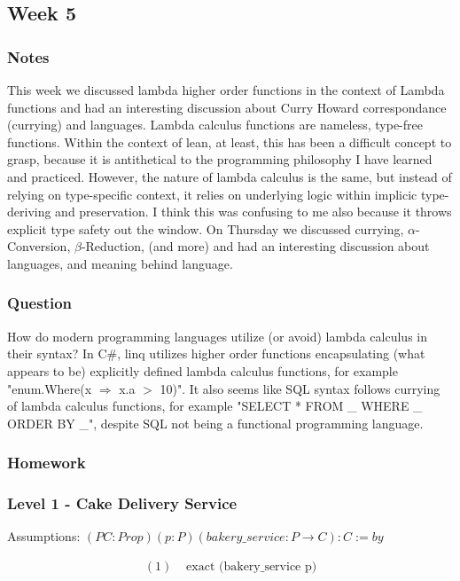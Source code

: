 \documentclass{article}
\theoremstyle{theorem}
\theoremstyle{definition}
\theoremstyle{remark}
\begin{document}
\subsection{Week 5}

\subsubsection*{Notes} This week we discussed lambda higher order functions 
in the context of Lambda functions and had an interesting discussion about Curry 
Howard correspondance (currying) and languages. Lambda calculus functions are nameless, 
type-free functions. Within the context of lean, at least, this has been a difficult concept 
to grasp, because it is antithetical to the programming philosophy I have learned and practiced. 
However, the nature of lambda calculus is the same, but instead of relying on type-specific context, 
it relies on underlying logic within implicic type-deriving and preservation. I think this was 
confusing to me also because it throws explicit type safety out the window. On Thursday we discussed 
currying, $\alpha$-Conversion, $\beta$-Reduction, (and more) and had an interesting discussion about languages, 
and meaning behind language.  

\subsubsection*{Question} How do modern programming languages utilize (or avoid) lambda calculus in their syntax? In C\#, linq utilizes higher order functions encapsulating (what appears to be) explicitly defined lambda calculus functions, for example "enum.Where(x $\Rightarrow$ x.a $>$ 10)". It also seems like SQL syntax follows currying of lambda calculus functions, for example "SELECT * FROM \_ WHERE \_ ORDER BY \_", despite SQL not being a functional programming language.

\subsubsection*{Homework}

\subsubsection*{Level 1 - Cake Delivery Service}
Assumptions: $(P C: Prop)(p: P)(bakery\_service : P \rightarrow C) : C := by$

\[
\begin{aligned}
  (1)&\text{ exact (bakery\_service p)}
\end{aligned}
\]
\end{document}
